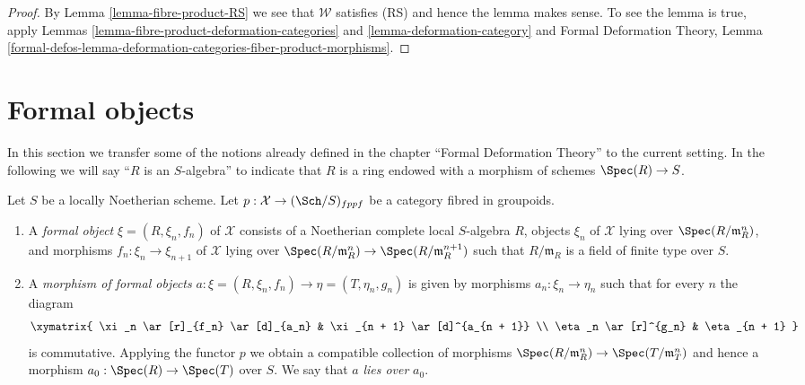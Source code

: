 \begin{proof}
By Lemma \ref{lemma-fibre-product-RS} we see that $\mathcal{W}$
satisfies (RS) and hence the lemma makes sense. To see the lemma
is true, apply Lemmas \ref{lemma-fibre-product-deformation-categories} and
\ref{lemma-deformation-category}
and Formal Deformation Theory, Lemma
\ref{formal-defos-lemma-deformation-categories-fiber-product-morphisms}.
\end{proof}






\section{Formal objects}
\label{section-formal-objects}

\noindent
In this section we transfer some of the notions already defined
in the chapter ``Formal Deformation Theory'' to the current setting.
In the following we will say ``$R$ is an $S$-algebra'' to indicate
that $R$ is a ring endowed with a morphism of schemes $\Spec(R) \to S$.

\begin{definition}
\label{definition-formal-objects}
Let $S$ be a locally Noetherian scheme. Let
$p : \mathcal{X} \to (\Sch/S)_{fppf}$ be a category fibred in groupoids.
\begin{enumerate}
\item A {\it formal object} $\xi = (R, \xi_n, f_n)$ of $\mathcal{X}$ consists
of a Noetherian complete local $S$-algebra $R$, objects $\xi_n$ of
$\mathcal{X}$ lying over $\Spec(R/\mathfrak m_R^n)$, and morphisms
$f_n : \xi_n \to \xi_{n + 1}$ of $\mathcal{X}$ lying over
$\Spec(R/\mathfrak m_R^n) \to \Spec(R/\mathfrak m_R^{n + 1})$
such that $R/\mathfrak m_R$ is a field of finite type over $S$.
\item A {\it morphism of formal objects}
$a : \xi = (R, \xi_n, f_n) \to \eta = (T, \eta_n, g_n)$
is given by morphisms $a_n : \xi_n \to \eta_n$ such that for every $n$
the diagram
$$
\xymatrix{
\xi_n \ar[r]_{f_n} \ar[d]_{a_n} & \xi_{n + 1} \ar[d]^{a_{n + 1}} \\
\eta_n \ar[r]^{g_n} & \eta_{n + 1}
}
$$
is commutative. Applying the functor $p$ we obtain a compatible collection
of morphisms $\Spec(R/\mathfrak m_R^n) \to \Spec(T/\mathfrak m_T^n)$ and
hence a morphism $a_0 : \Spec(R) \to \Spec(T)$ over $S$. We say that
$a$ {\it lies over} $a_0$.
\end{enumerate}
\end{definition}

